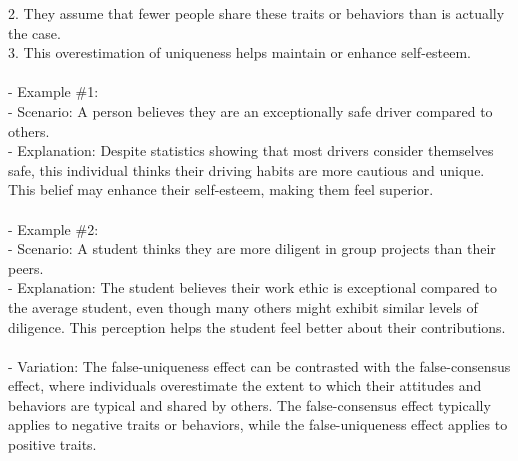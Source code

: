 \documentclass[a4paper,12pt,single,pdftex]{scrbook}
\begin{document}
    
        2. They assume that fewer people share these traits or behaviors than is actually the case.
    \\

    
        3. This overestimation of uniqueness helps maintain or enhance self-esteem.
    \\

    
      
    \\

    
      - Example \#1:
    \\

    
        - Scenario: A person believes they are an exceptionally safe driver compared to others.
    \\

    
        - Explanation: Despite statistics showing that most drivers consider themselves safe, this individual thinks their driving habits are more cautious and unique. This belief may enhance their self-esteem, making them feel superior.
    \\

    
      
    \\

    
      - Example \#2:
    \\

    
        - Scenario: A student thinks they are more diligent in group projects than their peers.
    \\

    
        - Explanation: The student believes their work ethic is exceptional compared to the average student, even though many others might exhibit similar levels of diligence. This perception helps the student feel better about their contributions.
    \\

    
      
    \\

    
      - Variation: The false-uniqueness effect can be contrasted with the false-consensus effect, where individuals overestimate the extent to which their attitudes and behaviors are typical and shared by others. The false-consensus effect typically applies to negative traits or behaviors, while the false-uniqueness effect applies to positive traits.
    \\

    
      
    \\
\end{document}
